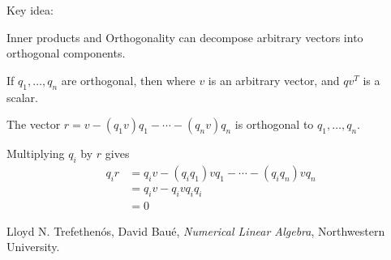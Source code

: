 \documentclass[11pt]{article}
\begin{document}
Key idea:

Inner products and Orthogonality can decompose arbitrary vectors into orthogonal components.

\begin{theorem}
  If $q_1, \dots, q_n$ are orthogonal, then
  where $v$ is an arbitrary vector, and $qv^T$ is a scalar.

  The vector $r = v - (q_1v)q_1 - \cdots - (q_nv)q_n$ is orthogonal to $q_1, \dots, q_n$.

  Multiplying $q_i$ by $r$ gives
  \begin{align*}
    q_i r &= q_i v - (q_i q_1)vq_1 - \cdots - (q_i q_n)vq_n \\
    &= q_i v - q_i v q_i q_i \\
    &= 0
  \end{align*}
\end{theorem}


%


\begin{thebibliography}{77}

Lloyd N. Trefethen\'{o}s, David Bau\'{e},
\emph{Numerical Linear Algebra},
Northwestern University.

\end{thebibliography}
\end{document}
